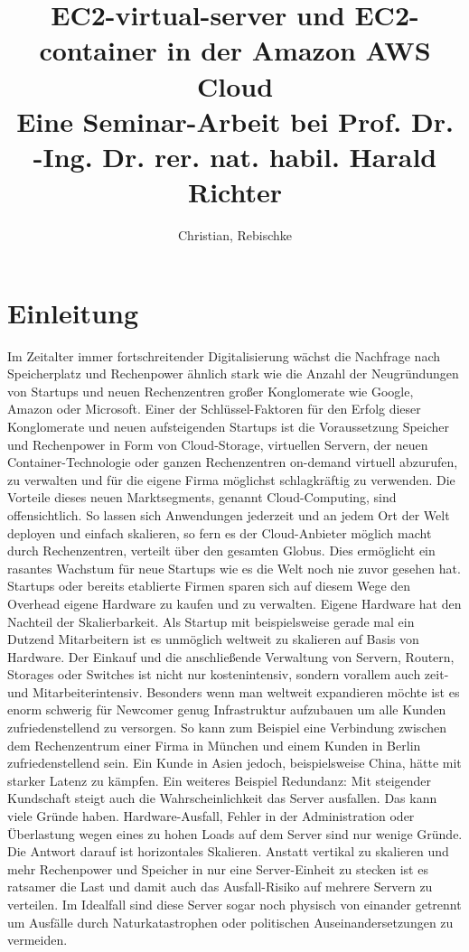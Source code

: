 \documentclass[titlepage]{report}
\title{EC2-virtual-server und EC2-container in der Amazon AWS Cloud \\
\large Eine Seminar-Arbeit bei Prof. Dr. -Ing. Dr. rer. nat. habil.
Harald Richter}
\author{Christian, Rebischke}
\begin{document}
\maketitle
\tableofcontents
\newpage
\chapter{Einleitung}
Im Zeitalter immer fortschreitender Digitalisierung wächst die Nachfrage
nach Speicherplatz und Rechenpower ähnlich stark wie die Anzahl der
Neugründungen von Startups und neuen Rechenzentren großer Konglomerate
wie Google, Amazon oder Microsoft. Einer der Schlüssel-Faktoren für den Erfolg
dieser Konglomerate und neuen aufsteigenden Startups ist die
Voraussetzung Speicher und Rechenpower in Form von Cloud-Storage,
virtuellen Servern, der neuen Container-Technologie oder ganzen Rechenzentren
on-demand virtuell abzurufen, zu verwalten und für die eigene Firma
möglichst schlagkräftig zu verwenden. Die Vorteile dieses neuen Marktsegments,
genannt Cloud-Computing, sind offensichtlich. So lassen sich Anwendungen
jederzeit und an jedem Ort der Welt deployen und einfach skalieren, so
fern es der Cloud-Anbieter möglich macht durch Rechenzentren, verteilt
über den gesamten Globus. Dies ermöglicht ein rasantes Wachstum für neue
Startups wie es die Welt noch nie zuvor gesehen hat. Startups oder
bereits etablierte Firmen sparen sich auf diesem Wege den Overhead
eigene Hardware zu kaufen und zu verwalten. Eigene Hardware hat den
Nachteil der Skalierbarkeit. Als Startup mit beispielsweise gerade mal ein Dutzend
Mitarbeitern ist es unmöglich weltweit zu skalieren auf Basis von
Hardware. Der Einkauf und die anschließende Verwaltung von Servern,
Routern, Storages oder Switches ist nicht nur kostenintensiv, sondern
vorallem auch zeit- und Mitarbeiterintensiv. Besonders wenn man weltweit
expandieren möchte ist es enorm schwerig für Newcomer genug
Infrastruktur aufzubauen um alle Kunden zufriedenstellend zu versorgen.
So kann zum Beispiel eine Verbindung zwischen dem Rechenzentrum einer
Firma in München und einem Kunden in Berlin zufriedenstellend sein. Ein
Kunde in Asien jedoch, beispielsweise China, hätte mit starker Latenz zu
kämpfen. Ein weiteres Beispiel Redundanz: Mit steigender Kundschaft
steigt auch die Wahrscheinlichkeit das Server ausfallen. Das kann viele
Gründe haben. Hardware-Ausfall, Fehler in der Administration oder
Überlastung wegen eines zu hohen Loads auf dem Server sind nur wenige
Gründe. Die Antwort darauf ist horizontales Skalieren. Anstatt vertikal
zu skalieren und mehr Rechenpower und Speicher in nur eine
Server-Einheit zu stecken ist es ratsamer die Last und damit auch das
Ausfall-Risiko auf mehrere Servern zu verteilen. Im Idealfall sind diese
Server sogar noch physisch von einander getrennt um Ausfälle durch
Naturkatastrophen oder politischen Auseinandersetzungen zu vermeiden.
\newpage
\end{document}
